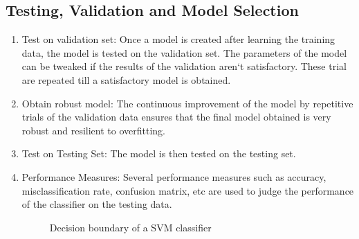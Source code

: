 \documentclass[letterpaper,12pt, onecolumn]{article}%
\begin{document}
\subsection{Testing, Validation and Model Selection}
\begin{enumerate}
\item Test on validation set: Once a model is created after learning the training data, the model is tested on the validation set. The parameters of the model can be tweaked if the results of the validation aren`t satisfactory. These trial are repeated till a satisfactory model is obtained.

\item Obtain robust model: The continuous improvement of the model by repetitive trials of the validation data ensures that the final model obtained is very robust and resilient to overfitting.

\item Test on Testing Set: The model is then tested on the testing set.

\item Performance Measures: Several performance measures such as accuracy, misclassification rate, confusion matrix, etc are used to judge the performance of the classifier on the testing data. 
\begin{figure}[!hbtp]
 	  \centering
  		\quad
 	   \caption{Decision boundary of a SVM classifier }
       \label{fig:deci_bndry}
\end{figure}


\end{enumerate}
\end{document}
